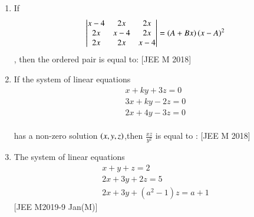 \documentclass[journal,,12pt,twocolumn]{IEEEtran}
\theoremstyle{remark}
\begin{document}
\begin{enumerate}
\begin{enumerate}
\end{enumerate} 
\item If \begin{align*} \begin{vmatrix}
x-4 & 2x  & 2x\\
2x & x-4 & 2x \\
 2x & 2x & x-4 
\end{vmatrix} =\left(A+Bx\right)\left(x-A\right)^2\end{align*}, then the ordered pair  is equal to: 
\hfill{[JEE M 2018]}
\begin{enumerate}
\end{enumerate}
\item If the system of linear equations \\
\begin{align*}x+ky+3z=0 \\
3x+ky-2z=0 \\
2x+4y-3z=0 \end{align*}\\
has a non-zero solution $\left(x,y,z\right)$,then $\frac{xz}{y^2}$ is equal to :
\hfill{[JEE M 2018]}
\begin{enumerate}
\end{enumerate}
\item The system of linear equations \\
\begin{align*}x+y+z=2 \\
2x+3y+2z=5 \\
2x+3y+(a^2-1)z=a+1 \end{align*} 
\hfill{[JEE M2019-9 Jan(M)]}
\begin{enumerate}
\begin{multicols}{1}
    


\end{multicols}
\end{enumerate}
\end{enumerate}
\end{document}
